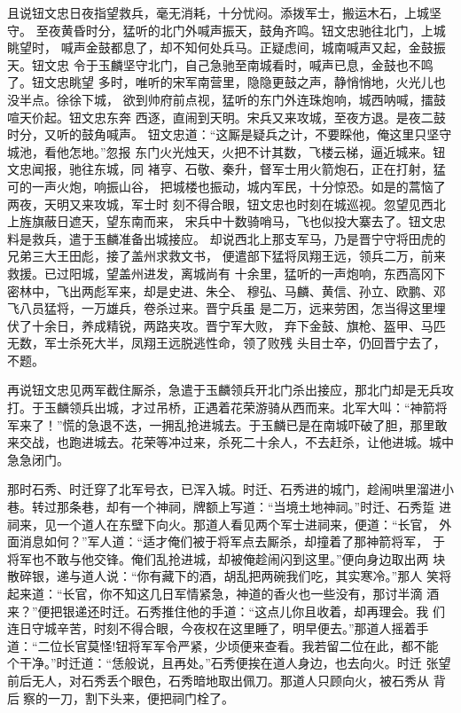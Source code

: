 且说钮文忠日夜指望救兵，毫无消耗，十分忧闷。添拨军士，搬运木石，上城坚守。
至夜黄昏时分，猛听的北门外喊声振天，鼓角齐鸣。钮文忠驰往北门，上城眺望时，
喊声金鼓都息了，却不知何处兵马。正疑虑间，城南喊声又起，金鼓振天。钮文忠
令于玉麟坚守北门，自己急驰至南城看时，喊声已息，金鼓也不鸣了。钮文忠眺望
多时，唯听的宋军南营里，隐隐更鼓之声，静悄悄地，火光儿也没半点。徐徐下城，
欲到帅府前点视，猛听的东门外连珠炮响，城西呐喊，擂鼓喧天价起。钮文忠东奔
西逐，直闹到天明。宋兵又来攻城，至夜方退。是夜二鼓时分，又听的鼓角喊声。
钮文忠道：“这厮是疑兵之计，不要睬他，俺这里只坚守城池，看他怎地。”忽报
东门火光烛天，火把不计其数，飞楼云梯，逼近城来。钮文忠闻报，驰往东城，同
褚亨、石敬、秦升，督军士用火箭炮石，正在打射，猛可的一声火炮，响振山谷，
把城楼也振动，城内军民，十分惊恐。如是的蒿恼了两夜，天明又来攻城，军士时
刻不得合眼，钮文忠也时刻在城巡视。忽望见西北上旌旗蔽日遮天，望东南而来，
宋兵中十数骑哨马，飞也似投大寨去了。钮文忠料是救兵，遣于玉麟准备出城接应。
却说西北上那支军马，乃是晋宁守将田虎的兄弟三大王田彪，接了盖州求救文书，
便遣部下猛将凤翔王远，领兵二万，前来救援。已过阳城，望盖州进发，离城尚有
十余里，猛听的一声炮响，东西高冈下密林中，飞出两彪军来，却是史进、朱仝、
穆弘、马麟、黄信、孙立、欧鹏、邓飞八员猛将，一万雄兵，卷杀过来。晋宁兵虽
是二万，远来劳困，怎当得这里埋伏了十余日，养成精锐，两路夹攻。晋宁军大败，
弃下金鼓、旗枪、盔甲、马匹无数，军士杀死大半，凤翔王远脱逃性命，领了败残
头目士卒，仍回晋宁去了，不题。

再说钮文忠见两军截住厮杀，急遣于玉麟领兵开北门杀出接应，那北门却是无兵攻
打。于玉麟领兵出城，才过吊桥，正遇着花荣游骑从西而来。北军大叫：“神箭将
军来了！”慌的急退不迭，一拥乱抢进城去。于玉麟已是在南城吓破了胆，那里敢
来交战，也跑进城去。花荣等冲过来，杀死二十余人，不去赶杀，让他进城。城中
急急闭门。

那时石秀、时迁穿了北军号衣，已浑入城。时迁、石秀进的城门，趁闹哄里溜进小
巷。转过那条巷，却有一个神祠，牌额上写道：“当境土地神祠。”时迁、石秀踅
进祠来，见一个道人在东壁下向火。那道人看见两个军士进祠来，便道：“长官，
外面消息如何？”军人道：“适才俺们被于将军点去厮杀，却撞着了那神箭将军，
于将军也不敢与他交锋。俺们乱抢进城，却被俺趁闹闪到这里。”便向身边取出两
块散碎银，递与道人说：“你有藏下的酒，胡乱把两碗我们吃，其实寒冷。”那人
笑将起来道：“长官，你不知这几日军情紧急，神道的香火也一些没有，那讨半滴
酒来？”便把银递还时迁。石秀推住他的手道：“这点儿你且收着，却再理会。我
们连日守城辛苦，时刻不得合眼，今夜权在这里睡了，明早便去。”那道人摇着手
道：“二位长官莫怪!钮将军军令严紧，少顷便来查看。我若留二位在此，都不能
个干净。”时迁道：“恁般说，且再处。”石秀便挨在道人身边，也去向火。时迁
张望前后无人，对石秀丢个眼色，石秀暗地取出佩刀。那道人只顾向火，被石秀从
背后察的一刀，割下头来，便把祠门栓了。

